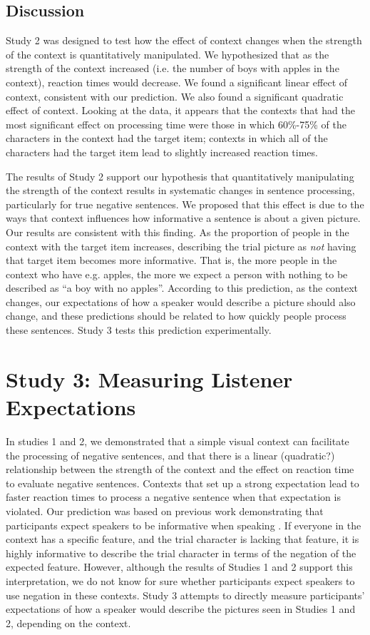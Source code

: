 \documentclass[10pt,letterpaper]{article}
\begin{document}
\subsection{Discussion}
Study 2 was designed to test how the effect of context changes when the strength of the context is quantitatively manipulated.  We hypothesized that as the strength of the context increased (i.e. the number of boys with apples in the context), reaction times would decrease.  We found a significant linear effect of context, consistent with our prediction.  We also found a significant quadratic effect of context.  Looking at the data, it appears that the contexts that had the most significant effect on processing time were those in which 60\%-75\% of the characters in the context had the target item; contexts in which all of the characters had the target item lead to slightly increased reaction times.    

The results of Study 2 support our hypothesis that quantitatively manipulating the strength of the context results in systematic changes in sentence processing, particularly for true negative sentences.  We proposed that this effect is due to the ways that context influences how informative a sentence is about a given picture.  Our results are consistent with this finding.  As the proportion of people in the context with the target item increases, describing the trial picture as \emph{not} having that target item becomes more informative.  That is, the more people in the context who have e.g. apples, the more we expect a person with nothing to be described as ``a boy with no apples''.  According to this prediction, as the context changes, our expectations of how a speaker would describe a picture should also change, and these predictions should be related to how quickly people process these sentences.  Study 3 tests this prediction experimentally.  

\section{Study 3: Measuring Listener Expectations}
In studies 1 and 2, we demonstrated that a simple visual context can facilitate the processing of negative sentences, and that there is a linear (quadratic?) relationship between the strength of the context and the effect on reaction time to evaluate negative sentences.  Contexts that set up a strong expectation lead to faster reaction times to process a negative sentence when that expectation is violated.  Our prediction was based on previous work demonstrating that participants expect speakers to be informative when speaking \cite{frank2012}.  If everyone in the context has a specific feature, and the trial character is lacking that feature, it is highly informative to describe the trial character in terms of the negation of the expected feature.  However, although the results of Studies 1 and 2 support this interpretation, we do not know for sure whether participants expect speakers to use negation in these contexts.  Study 3 attempts to directly measure participants' expectations of how a speaker would describe the pictures seen in Studies 1 and 2, depending on the context.
\end{document}

